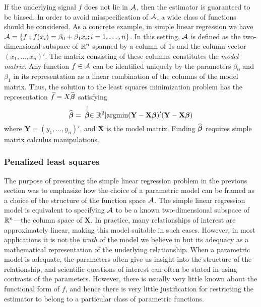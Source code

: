 If the underlying signal $f$ does not lie in $\mathcal{A}$, then the estimator is guaranteed to be biased. In order to avoid misspecification of $\mathcal{A}$, a wide class of functions should be considered.  As a concrete example, in simple linear regression we have $\mathcal{A} = \{f: f(x_i) = \beta_0 + \beta_1x_i ; i=1,\dots,n \}$. In this setting, $\mathcal{A}$ is defined as the two-dimensional subspace of $ \mathbb{R} ^n$ spanned by a column of 1s and the column vector $(x_1,\dots, x_n)'$. The matrix consisting of these columns constitutes the \textit{model matrix.} Any function $f \in \mathcal{A}$ can be identified uniquely by the parameters $\beta_0$ and $\beta_1$ in its representation as a linear combination of the columns of the model matrix. Thus, the solution to the least squares minimization problem has the representation $\widehat{f} = X\widehat{\boldsymbol\beta}$ satisfying 
\begin{equation*}
\widehat{\boldsymbol\beta} =  \hspace{.07in}  \stackrel[{\boldsymbol\beta} \in  \mathbb{R} ^2]{}{\mbox{argmin}} (\textbf{Y} - \textbf{X}\boldsymbol\beta)'(\textbf{Y} - \textbf{X}\boldsymbol\beta)
\label{eq:LS2}
\end{equation*}
where $\textbf{Y}=(y_1,\dots, y_n)'$, and $\textbf{X}$ is the model matrix. Finding $\widehat{\boldsymbol\beta}$ requires simple matrix calculus manipulations. 

\subsubsection{Penalized least squares} \label{PLS}
  The purpose of presenting the simple linear regression problem in the previous section was to emphasize how the choice of a parametric model can be framed as a choice of the structure of the function space $\mathcal{A}$. The simple linear regression model is equivalent to specifying $\mathcal{A}$ to be a known two-dimensional subspace of $ \mathbb{R} ^n$---the column space of $\textbf{X}$. In practice, many relationships of interest are approximately linear, making this model suitable in such cases. However, in most applications it is not the \textit{truth} of the model we believe in but its adequacy as a mathematical representation of the underlying relationship. When a parametric model is adequate, the parameters often give us insight into the structure of the relationship, and scientific questions of interest can often be stated in using contrasts of the parameters. However, there is usually very little known about the functional form of $f$, and hence there is very little justification for restricting the estimator to belong to a particular class of parametric functions. 
 
